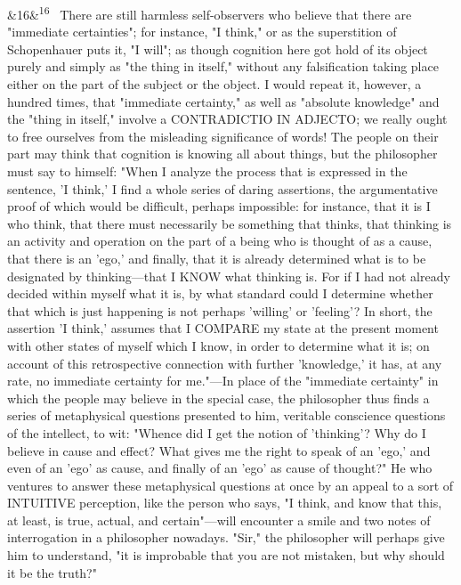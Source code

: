 \documentclass[12pt]{article}
\newcommand{\para}[1][]{\par\noindent\ifx&#1&\else\textsuperscript{\footnotesize #1}~\fi}
\begin{document}
\para[16] There are still harmless self-observers who believe that there are "immediate certainties"; for instance, "I think," or as the superstition of Schopenhauer puts it, "I will"; as though cognition here got hold of its object purely and simply as "the thing in itself," without any falsification taking place either on the part of the subject or the object. I would repeat it, however, a hundred times, that "immediate certainty," as well as "absolute knowledge" and the "thing in itself," involve a CONTRADICTIO IN ADJECTO; we really ought to free ourselves from the misleading significance of words! The people on their part may think that cognition is knowing all about things, but the philosopher must say to himself: "When I analyze the process that is expressed in the sentence, 'I think,' I find a whole series of daring assertions, the argumentative proof of which would be difficult, perhaps impossible: for instance, that it is I who think, that there must necessarily be something that thinks, that thinking is an activity and operation on the part of a being who is thought of as a cause, that there is an 'ego,' and finally, that it is already determined what is to be designated by thinking---that I KNOW what thinking is. For if I had not already decided within myself what it is, by what standard could I determine whether that which is just happening is not perhaps 'willing' or 'feeling'? In short, the assertion 'I think,' assumes that I COMPARE my state at the present moment with other states of myself which I know, in order to determine what it is; on account of this retrospective connection with further 'knowledge,' it has, at any rate, no immediate certainty for me."---In place of the "immediate certainty" in which the people may believe in the special case, the philosopher thus finds a series of metaphysical questions presented to him, veritable conscience questions of the intellect, to wit: "Whence did I get the notion of 'thinking'? Why do I believe in cause and effect? What gives me the right to speak of an 'ego,' and even of an 'ego' as cause, and finally of an 'ego' as cause of thought?" He who ventures to answer these metaphysical questions at once by an appeal to a sort of INTUITIVE perception, like the person who says, "I think, and know that this, at least, is true, actual, and certain"---will encounter a smile and two notes of interrogation in a philosopher nowadays. "Sir," the philosopher will perhaps give him to understand, "it is improbable that you are not mistaken, but why should it be the truth?"
\end{document}
